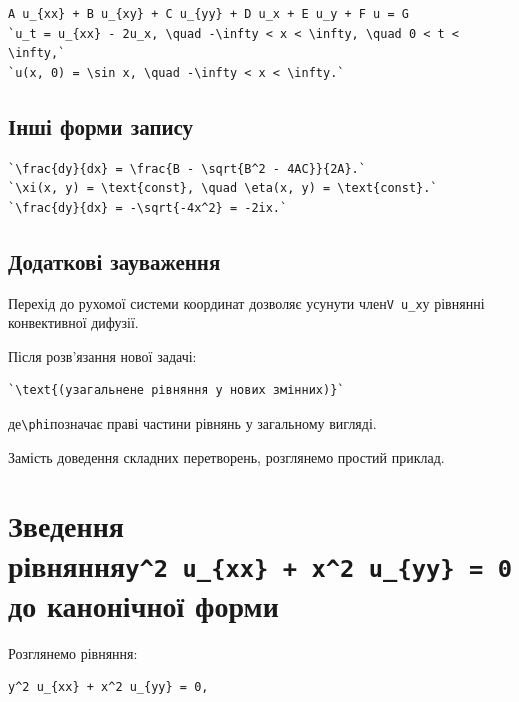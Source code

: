 \documentclass[
  ukrainian,
]{article}
\begin{document}
\begin{verbatim}
A u_{xx} + B u_{xy} + C u_{yy} + D u_x + E u_y + F u = G
`u_t = u_{xx} - 2u_x, \quad -\infty < x < \infty, \quad 0 < t < \infty,`
`u(x, 0) = \sin x, \quad -\infty < x < \infty.`
\end{verbatim}

\subsection{Інші форми
запису}\label{ux456ux43dux448ux456-ux444ux43eux440ux43cux438-ux437ux430ux43fux438ux441ux443}

\begin{verbatim}
`\frac{dy}{dx} = \frac{B - \sqrt{B^2 - 4AC}}{2A}.`
`\xi(x, y) = \text{const}, \quad \eta(x, y) = \text{const}.`
`\frac{dy}{dx} = -\sqrt{-4x^2} = -2ix.`
\end{verbatim}

\subsection{Додаткові
зауваження}\label{ux434ux43eux434ux430ux442ux43aux43eux432ux456-ux437ux430ux443ux432ux430ux436ux435ux43dux43dux44f}

Перехід до рухомої системи координат дозволяє усунути
член\texttt{V\ u\_x}у рівнянні конвективної дифузії.

Після розв'язання нової задачі:

\begin{verbatim}
`\text{(узагальнене рівняння у нових змінних)}`
\end{verbatim}

де\texttt{\textbackslash{}phi}позначає праві частини рівнянь у
загальному вигляді.

Замість доведення складних перетворень, розглянемо простий приклад.

\section{\texorpdfstring{Зведення
рівняння\texttt{y\^{}2\ u\_\{xx\}\ +\ x\^{}2\ u\_\{yy\}\ =\ 0}до
канонічної
форми}{Зведення рівнянняy\^{}2 u\_\{xx\} + x\^{}2 u\_\{yy\} = 0до канонічної форми}}\label{ux437ux432ux435ux434ux435ux43dux43dux44f-ux440ux456ux432ux43dux44fux43dux43dux44fy2-u_xx-x2-u_yy-0ux434ux43e-ux43aux430ux43dux43eux43dux456ux447ux43dux43eux457-ux444ux43eux440ux43cux438}

Розглянемо рівняння:

\begin{verbatim}
y^2 u_{xx} + x^2 u_{yy} = 0,
\end{verbatim}
\end{document}
